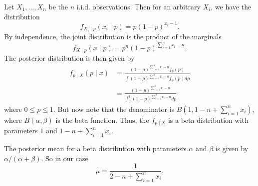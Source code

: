 \documentclass{article}
\begin{document}
Let $X_1, \dots , X_n$ be the $n$ i.i.d. observations. Then for an arbitrary $X_i$, we have the distribution
\[
f_{X_i \mid p} (x_i \mid p) = p(1-p)^{x_i - 1}.
\]
By independence, the joint distribution is the product of the marginals
\[
f_{X \mid p} (x \mid p) = p^n(1-p)^{\sum_{i=1}^n x_i - n}.
\]
The posterior distribution is then given by
\begin{align*}
f_{p \mid X}(p \mid x)
&= \frac{(1-p)^{\sum_{i=1}^n x_i - n}f_p(p)}{\int (1-p)^{\sum_{i=1}^n x_i - n} f_p(p)dp}\\
&= \frac{(1-p)^{\sum_{i=1}^n x_i - n}}{\int_0^1 (1-p)^{\sum_{i=1}^n x_i - n}dp}
\end{align*}
where $0 \leq p \leq 1$. But now note that the denominator is $B \left (1, 1 - n + \sum_{i=1}^n x_i \right )$, where $B(\alpha, \beta)$ is the beta function. Thus, the $f_{p \mid X}$ is a beta distribution with parameters $1$ and $1 - n + \sum_{i=1}^n x_i$.

The posterior mean for a beta distribution with parameters $\alpha$ and $\beta$ is given by $\alpha/(\alpha + \beta)$. So in our case
\[
\mu = \frac{1}{2 - n + \sum_{i=1}^n x_i}.
\]
\end{document}
